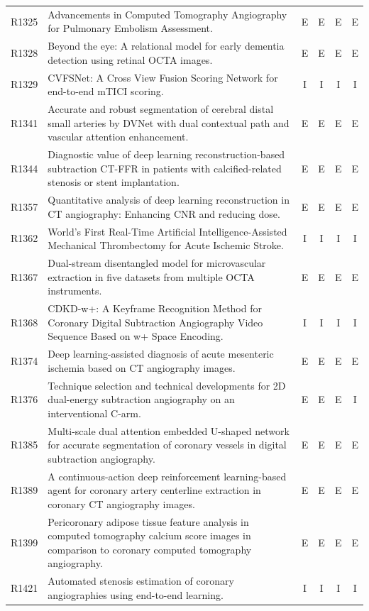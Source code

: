 \begin{longtable}{@{}l p{8.6cm} c c c c@{}}
R1325 & Advancements in Computed Tomography Angiography for Pulmonary Embolism Assessment. & E & E & E & E \\
R1328 & Beyond the eye: A relational model for early dementia detection using retinal OCTA images. & E & E & E & E \\
R1329 & CVFSNet: A Cross View Fusion Scoring Network for end-to-end mTICI scoring. & I & I & I & I \\
R1341 & Accurate and robust segmentation of cerebral distal small arteries by DVNet with dual contextual path and vascular attention enhancement. & E & E & E & E \\
R1344 & Diagnostic value of deep learning reconstruction-based subtraction CT-FFR in patients with calcified-related stenosis or stent implantation. & E & E & E & E \\
R1357 & Quantitative analysis of deep learning reconstruction in CT angiography: Enhancing CNR and reducing dose. & E & E & E & E \\
R1362 & World's First Real-Time Artificial Intelligence-Assisted Mechanical Thrombectomy for Acute Ischemic Stroke. & I & I & I & I \\
R1367 & Dual-stream disentangled model for microvascular extraction in five datasets from multiple OCTA instruments. & E & E & E & E \\
R1368 & CDKD-w+: A Keyframe Recognition Method for Coronary Digital Subtraction Angiography Video Sequence Based on w+ Space Encoding. & I & I & I & I \\
R1374 & Deep learning-assisted diagnosis of acute mesenteric ischemia based on CT angiography images. & E & E & E & E \\
R1376 & Technique selection and technical developments for 2D dual-energy subtraction angiography on an interventional C-arm. & E & E & E & I \\
R1385 & Multi-scale dual attention embedded U-shaped network for accurate segmentation of coronary vessels in digital subtraction angiography. & E & E & E & E \\
R1389 & A continuous-action deep reinforcement learning-based agent for coronary artery centerline extraction in coronary CT angiography images. & E & E & E & E \\
R1399 & Pericoronary adipose tissue feature analysis in computed tomography calcium score images in comparison to coronary computed tomography angiography. & E & E & E & E \\
R1421 & Automated stenosis estimation of coronary angiographies using end-to-end learning. & I & I & I & I \\

\end{longtable}
